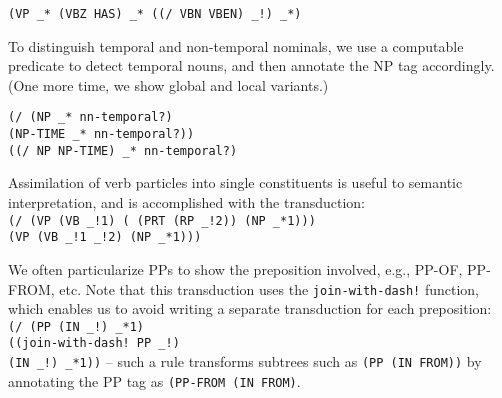 \documentclass[a4,11pt]{article}
\begin{document}
\scriptsize
\noindent \hspace*{0.5em}\texttt{(VP \_* (VBZ HAS) \_* ((/ VBN VBEN) \_!) \_*)}\\
\normalsize

To distinguish temporal and non-temporal nominals, we use a computable predicate to detect temporal nouns, and then annotate the NP tag accordingly. (One more time, we show global and local variants.)

\texttt{(/ (NP \_* nn-temporal?)}\\
\hspace*{3em}\texttt{(NP-TIME \_* nn-temporal?))}\\

\small %
\texttt{((/ NP NP-TIME) \_* nn-temporal?)}
\normalsize


Assimilation of verb particles into single constituents is useful to semantic interpretation, and is accomplished with the transduction:\\
\scriptsize
\texttt{(/ (VP (VB \_!1) ({} (PRT (RP \_!2)) (NP \_*1)))}\\
\hspace*{2em}\texttt{(VP (VB \_!1 \_!2)  (NP \_*1)))}
\normalsize


We often particularize PPs to show the preposition involved, e.g., PP-OF, PP-FROM,  etc.  Note that this transduction uses the \texttt{join-with-dash!} function, which enables us to avoid writing a separate transduction for each preposition:\\
\small
\hspace*{1em}\texttt{(/ (PP (IN \_!) \_*1)}\\
\hspace*{3em}\texttt{((join-with-dash! PP \_!)}\\ 
\hspace*{3.8em}\texttt{(IN \_!) \_*1))}
\normalsize
\hspace*{2em}-- such a rule transforms subtrees such as \texttt{(PP (IN FROM))} by annotating the PP tag as \texttt{(PP-FROM (IN FROM)}.


\end{document}
